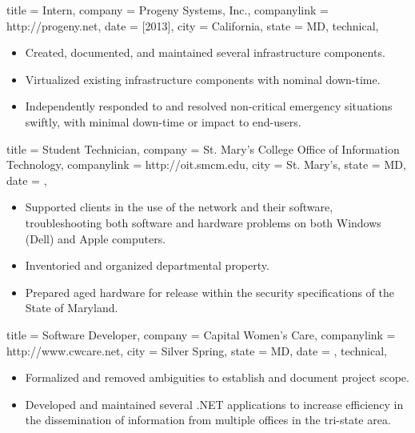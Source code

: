 \documentclass{bettercv}
\begin{document}
\begin{position}
  {
    title   = Intern,
    company = {Progeny Systems, Inc.},
    companylink = http://progeny.net,
    date    = [2013],
    city    = California,
    state   = MD,
    technical,
  }

\begin{itemize}
\item Created, documented, and maintained several infrastructure components.
\item Virtualized existing infrastructure components with nominal down-time.
\item Independently responded to and resolved non-critical emergency situations swiftly, with minimal down-time or impact to end-users.
\end{itemize}
\end{position}

\begin{position}
  {
    title   = Student Technician,
    company = St. Mary's College \Dash Office of Information Technology,
    companylink = http://oit.smcm.edu,
    city    = St. Mary's,
    state   = MD,
    date    = ,
  }

\begin{itemize}
\item Supported clients in the use of the network and their software,
  troubleshooting both software and hardware problems on both Windows (Dell) and Apple computers.
\item Inventoried and organized departmental property.
\item Prepared aged hardware for release within the security specifications of the State of Maryland.
\end{itemize}
\end{position}

\begin{position}
  {
    title   = Software Developer,
    company = Capital Women's Care,
    companylink = http://www.cwcare.net,
    city    = Silver Spring,
    state   = MD,
    date    = ,
    technical,
  }

\begin{itemize}
\item Formalized and removed ambiguities to establish and document project scope.
\item Developed and maintained several .NET applications to increase efficiency
  in the dissemination of information from multiple offices in the tri-state area.
\end{itemize}
\end{position}
\end{document}
